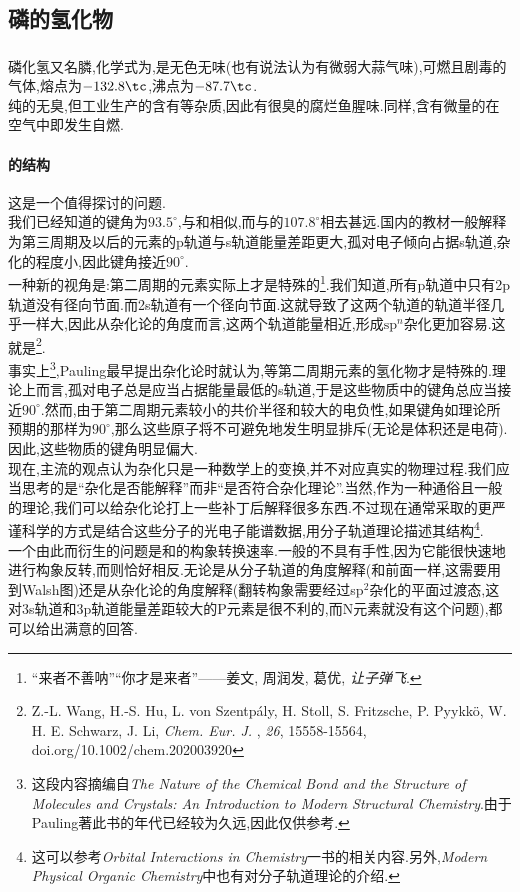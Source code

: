 \documentclass{ctexart}
\begin{document}
\subsection{磷的氢化物}
\subsubsection{}
\begin{substance}[\ce{PH3}]
    磷化氢又名膦,化学式为,是无色无味(也有说法认为有微弱大蒜气味),可燃且剧毒的气体,熔点为$-132.8\tc$,沸点为$-87.7\tc$.\\
    纯的无臭,但工业生产的含有等杂质,因此有很臭的腐烂鱼腥味.同样,含有微量的在空气中即发生自燃.
\end{substance}
\paragraph{的结构}
这是一个值得探讨的问题.\\
\indent 我们已经知道的键角为$93.5^\circ$,与和相似,而与的$107.8^\circ$相去甚远.国内的教材一般解释为第三周期及以后的元素的p轨道与s轨道能量差距更大,孤对电子倾向占据s轨道,杂化的程度小,因此键角接近$90^\circ$.\\
\indent 一种新的视角是:第二周期的元素实际上才是特殊的\footnote{“来者不善呐”“你才是来者”——姜文, 周润发, 葛优, \textit{让子弹飞}.}.我们知道,所有p轨道中只有2p轨道没有径向节面.而2s轨道有一个径向节面.这就导致了这两个轨道的轨道半径几乎一样大,因此从杂化论的角度而言,这两个轨道能量相近,形成$\text{sp}^n$杂化更加容易.这就是\footnote{Z.-L. Wang, H.-S. Hu, L. von Szentpály, H. Stoll, S. Fritzsche, P. Pyykkö, W. H. E. Schwarz, J. Li, \textit{Chem. Eur. J.} , \textit{26}, 15558-15564, doi.org/10.1002/chem.202003920}.\\
\indent 事实上\footnote{这段内容摘编自\textit{The Nature of the Chemical Bond and the Structure of Molecules and Crystals: An Introduction to Modern Structural Chemistry}.由于Pauling著此书的年代已经较为久远,因此仅供参考.},Pauling最早提出杂化论时就认为,等第二周期元素的氢化物才是特殊的.理论上而言,孤对电子总是应当占据能量最低的s轨道,于是这些物质中的键角总应当接近$90^\circ$.然而,由于第二周期元素较小的共价半径和较大的电负性,如果键角如理论所预期的那样为$90^\circ$,那么这些原子将不可避免地发生明显排斥(无论是体积还是电荷).因此,这些物质的键角明显偏大.\\
\indent 现在,主流的观点认为杂化只是一种数学上的变换,并不对应真实的物理过程.我们应当思考的是“杂化是否能解释”而非“是否符合杂化理论”.当然,作为一种通俗且一般的理论,我们可以给杂化论打上一些补丁后解释很多东西.不过现在通常采取的更严谨科学的方式是结合这些分子的光电子能谱数据,用分子轨道理论描述其结构\footnote{这可以参考\textit{Orbital Interactions in Chemistry}一书的相关内容.另外,\textit{Modern Physical Organic Chemistry}中也有对分子轨道理论的介绍.}.\\
\indent 一个由此而衍生的问题是和的构象转换速率.一般的不具有手性,因为它能很快速地进行构象反转,而则恰好相反.无论是从分子轨道的角度解释(和前面一样,这需要用到Walsh图)还是从杂化论的角度解释(翻转构象需要经过sp$^2$杂化的平面过渡态,这对3s轨道和3p轨道能量差距较大的P元素是很不利的,而N元素就没有这个问题),都可以给出满意的回答.
\end{document}
